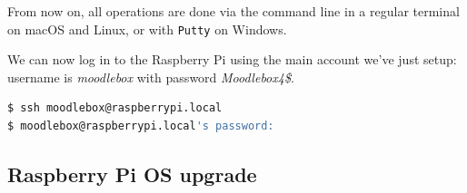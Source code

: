 \documentclass[12pt]{article}
\begin{document}

From now on, all operations are done via the command line in a regular terminal on macOS and Linux, or with \lstinline{Putty} on Windows.

We can now log in to the Raspberry Pi using the main account we've just setup: username is \emph{moodlebox} with password \emph{Moodlebox4\$}.

\begin{lstlisting}[language=bash]
$ ssh moodlebox@raspberrypi.local
$ moodlebox@raspberrypi.local's password:
\end{lstlisting}

\subsection{Raspberry Pi OS upgrade}
\end{document}
